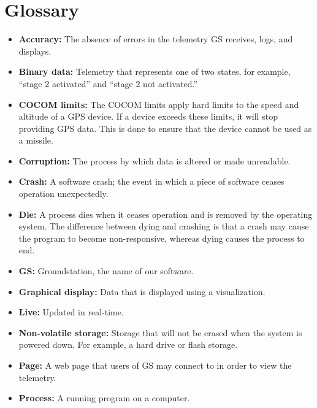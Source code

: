 \documentclass[10pt,draftclsnofoot,onecolumn]{IEEEtran}
\begin{document}
	\begin{minipage}{\textwidth}
	\section{Glossary}
		\begin{itemize}
		\item \textbf{Accuracy:} The absence of errors in the telemetry GS receives, logs, and displays.
		\item \textbf{Binary data:} Telemetry that represents one of two states, for example, ``stage 2 activated'' and
		``stage 2 not activated.''		
		\item \textbf{COCOM limits:} The \ac{COCOM} limits apply hard limits to the speed and altitude of a GPS device.
		If a device exceeds these limits, it will stop providing GPS data.
		This is done to ensure that the device cannot be used as a missile.		
		\item \textbf{Corruption:} The process by which data is altered or made unreadable.
		\item \textbf{Crash:} A software crash; the event in which a piece of software ceases operation unexpectedly.
		\item \textbf{Die:} A process dies when it ceases operation and is removed by the operating system.
		The difference between dying and crashing is that a crash may cause the program to become non-responsive,
		whereas dying causes the process to end.
		\item \textbf{GS:} Groundstation, the name of our software.
		\item \textbf{Graphical display:} Data that is displayed using a visualization.
		\item \textbf{Live:} Updated in real-time.
		\item \textbf{Non-volatile storage:} Storage that will not be erased when the system is powered down.
		For example, a hard drive or flash storage.
		\item \textbf{Page:} A web page that users of GS may connect to in order to view the telemetry.
		\item \textbf{Process:} A running program on a computer.

\end{itemize}
\end{minipage}
\end{document}
